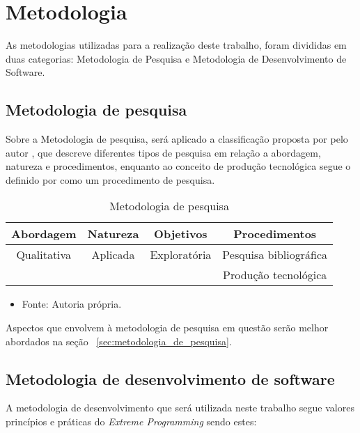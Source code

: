 \section{Metodologia}

As metodologias utilizadas para a realização deste trabalho, foram divididas em
duas categorias: Metodologia de Pesquisa e Metodologia de Desenvolvimento de
Software.

\subsection{Metodologia de pesquisa}

Sobre a Metodologia de pesquisa, será aplicado a classificação proposta por
pelo autor \cite{Gerhardt2009}, que descreve diferentes tipos de pesquisa em
relação a abordagem, natureza e procedimentos, enquanto ao conceito de produção
tecnológica segue o definido por \cite{Serzedello_Tomael_2011} como um
procedimento de pesquisa.

\begin{table}[ht]
   \centering
   \caption{Metodologia de pesquisa}
   \begin{tabular}{|c|c|c|c|}
      \hline
      \textbf{Abordagem} & \textbf{Natureza} & \textbf{Objetivos} & \textbf{Procedimentos} \\ \hline
      Qualitativa        & Aplicada          & Exploratória       & Pesquisa bibliográfica \\
                         &                   &                    & Produção tecnológica   \\ \hline
   \end{tabular}

   \begin{itemize}
      \item Fonte: Autoria própria.
   \end{itemize}

\end{table}

Aspectos que envolvem à metodologia de pesquisa em questão serão melhor
abordados na seção ~\ref{sec:metodologia_de_pesquisa}.

\subsection{Metodologia de desenvolvimento de software}

A metodologia de desenvolvimento que será utilizada neste trabalho segue
valores princípios e práticas do \emph{Extreme Programming}
\cite{10.5555/1076267} sendo estes:

